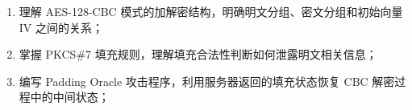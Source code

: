 \begin{enumerate}
    \item 理解 AES-128-CBC 模式的加解密结构，明确明文分组、密文分组和初始向量 IV 之间的关系；
    \item 掌握 PKCS\#7 填充规则，理解填充合法性判断如何泄露明文相关信息；
    \item 编写 Padding Oracle 攻击程序，利用服务器返回的填充状态恢复 CBC 解密过程中的中间状态；
\end{enumerate}
